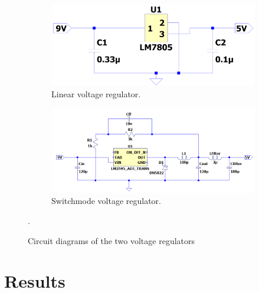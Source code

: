 \begin{figure}
 \footnotesize
   \centering
   \begin{subfigure}[]{0.35\textwidth}
        \includegraphics[width=\linewidth]{./Figures/Pictures/SpiceVoltRegLM7805.png}
	  \caption{Linear voltage regulator.} \label{subfig:linear_circuit_diagram}	
   \end{subfigure}
   \begin{subfigure}[]{0.55\textwidth}
  	 \includegraphics[width=\linewidth]{./Figures/Pictures/SpiceVoltRegLM2595.png}
	  \caption{Switchmode voltage regulator.} \label{subfig:switchmode_circuit_diagram}	
   \end{subfigure}
   
   \caption {Circuit diagrams of the two voltage regulators}.

      \label{fig:circuit_diagram}
 \end{figure}
\section{Results} \label{sec:volt_results}

